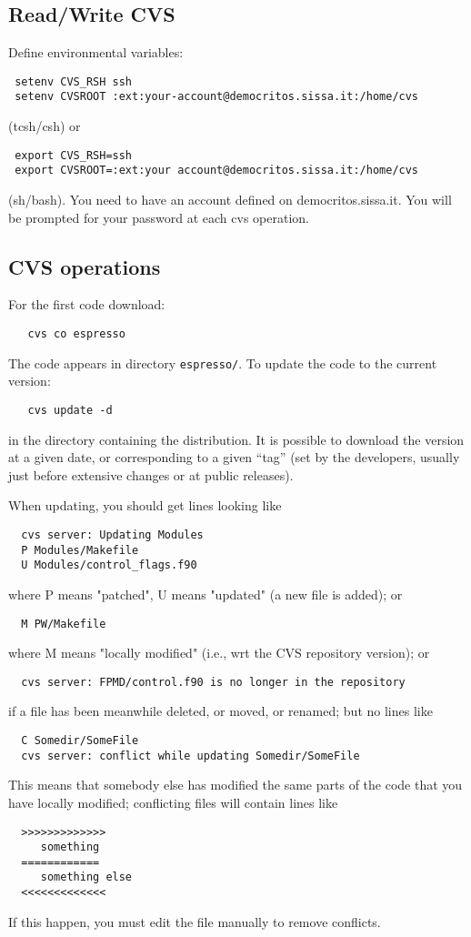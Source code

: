\documentclass[12pt,a4paper]{article}
\begin{document}
\subsection{Read/Write CVS}

Define environmental variables:
\begin{verbatim}
 setenv CVS_RSH ssh
 setenv CVSROOT :ext:your-account@democritos.sissa.it:/home/cvs
\end{verbatim}
(tcsh/csh) or
\begin{verbatim}
 export CVS_RSH=ssh
 export CVSROOT=:ext:your account@democritos.sissa.it:/home/cvs
\end{verbatim}
(sh/bash). You need to have an account defined on democritos.sissa.it.
You will be prompted for your password at each cvs operation.

\subsection{CVS operations}

For the first code download:
\begin{verbatim}
   cvs co espresso
\end{verbatim}
The code appears in directory \texttt{espresso/}.
To update the code to the current version:
\begin{verbatim}
   cvs update -d
\end{verbatim}
in the directory containing the distribution. It is possible 
to download the version at a given date, or corresponding to 
a given ``tag'' (set by the developers, usually just before 
extensive changes or at public releases).

When updating, you should get lines looking like
\begin{verbatim}
  cvs server: Updating Modules
  P Modules/Makefile
  U Modules/control_flags.f90
\end{verbatim}
where P means "patched", U means "updated" (a new file is added); or
\begin{verbatim}
  M PW/Makefile
\end{verbatim}
where M means "locally modified" (i.e., wrt the CVS repository
version); or
\begin{verbatim}
  cvs server: FPMD/control.f90 is no longer in the repository
\end{verbatim}
if a file has been meanwhile deleted, or moved, or renamed; but no lines like
\begin{verbatim}
  C Somedir/SomeFile
  cvs server: conflict while updating Somedir/SomeFile
\end{verbatim}
This means that somebody else has modified the same parts of the code 
that you have locally modified; conflicting files will contain lines like
\begin{verbatim}
  >>>>>>>>>>>>>
     something
  ============
     something else
  <<<<<<<<<<<<<
\end{verbatim}
If this happen, you must edit the file manually to remove conflicts.
\end{document}
